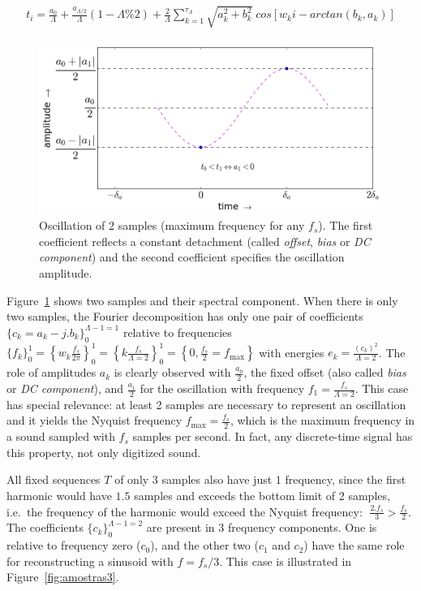 \begin{equation}\label{eq:reconsCompleta}
\begin{split}
	t_i = \frac{a_0}{\Lambda} + \frac{ a_{\Lambda/2}}{\Lambda}(1-\Lambda\% 2) + \frac{2}{\Lambda}\sum_{k=1}^{\tau_\Lambda}\sqrt{a_k^2 + b_k^2} \; cos\left[w_k i - arctan(b_k,a_k)\right]
\end{split}
\end{equation}

 \begin{figure}
     \centering
         \includegraphics[width=.7\textwidth]{figures/amostras2c___}
	 \caption{Oscillation of 2 samples (maximum frequency for any $f_s$). The first coefficient reflects a constant detachment (called \emph{offset}, \emph{bias} or \emph{DC component}) and the second coefficient specifies the oscillation amplitude.}
         \label{fig:amostras2}
 \end{figure}

Figure~\ref{fig:amostras2} shows two samples and their spectral component. When there is only two samples, the Fourier decomposition has only one pair of coefficients $\{c_k=a_k-j.b_k\}_0^{\Lambda-1=1}$ relative to frequencies $\{f_k\}_0^1=\left\{w_k\frac{f_s}{2\pi}\right\}_0^1=\left\{k\frac{f_s}{\Lambda=2}\right\}_0^1=\left\{0,\frac{f_s}{2}=f_{\text{max}}\right\}$
with energies $e_k=\frac{(c_k)^2}{\Lambda=2}$. The role of amplitudes $a_k$ is clearly observed with $\frac{a_0}{2}$, the fixed offset (also called \emph{bias} or \emph{DC component}), and $\frac{a_1}{2}$ for the oscillation with frequency $f_1=\frac{f_s}{\Lambda=2}$.
This case has special relevance: at least 2 samples are necessary to represent an oscillation and it yields the Nyquist frequency $f_{\text{max}}=\frac{f_s}{2}$, which is the maximum frequency in a sound sampled with $f_s$ samples per second. In fact, any discrete-time signal has this property, not only digitized sound.

All fixed sequences $T$ of only $3$ samples also have just $1$ frequency, since the first harmonic would have $1.5$ samples and exceeds the bottom limit of 2 samples, i.e.\ the frequency of the harmonic would exceed the Nyquist frequency:  $\; \frac{2. f_s}{3} > \frac{f_s}{2}$. 
The coefficients $\{c_k\}_0^{\Lambda-1=2}$ are present in 3 frequency components. One is relative to frequency zero ($c_0$), and the other two ($c_1$ and $c_2$) have the same role for reconstructing a sinusoid with $f=f_s/3$.
This case is illustrated in Figure~\ref{fig:amostras3}.

